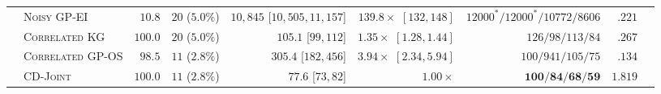 \documentclass{article}
\theoremstyle{plain}
\theoremstyle{definition}
\begin{document}
\begin{table}[!htbp]
{\begin{tabular}{@{}llrrrrrrr@{}}
 & \textsc{Noisy GP-EI} & $10.8$ & $20$ ($5.0\%$) & $10{,}845$ [$10{,}505,11{,}157$] & $139.8\times$ $[132,148]$ & $12000^* / 12000^* / 10772 / 8606$ & $.221$ \\
 & \textsc{Correlated KG} & $100.0$ & $20$ ($5.0\%$) & $105.1$ [$99,112$] & $1.35\times$ $[1.28,1.44]$ & $126 / 98 / 113 / 84$ & $.267$ \\
 & \textsc{Correlated GP-OS} & $98.5$ & $11$ ($2.8\%$) & $305.4$ [$182,456$] & $3.94\times$ $[2.34,5.94]$ & $100 / 941 / 105 / 75$ & $.134$ \\
 & \textsc{CD-Joint} & $100.0$ & $11$ ($2.8\%$) & $\mathbf{77.6}$ [$73,82$] & $1.00\times$ & $\mathbf{100} / \mathbf{84} / \mathbf{68} / \mathbf{59}$ & $1.819$ \\
\bottomrule
\end{tabular}%
}
\end{table}
\end{document}
